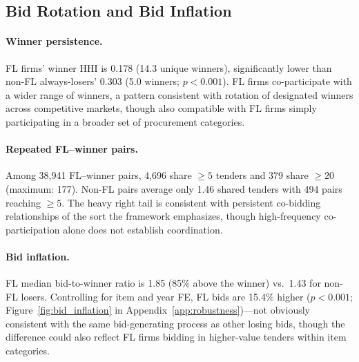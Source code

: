 
\subsection{Bid Rotation and Bid Inflation}
\label{sec:bid_rotation}

\paragraph{Winner persistence.}
FL firms' winner HHI is 0.178 (14.3 unique winners), significantly
lower than non-FL always-losers' 0.303 (5.0 winners; $p < 0.001$).
FL firms co-participate with a wider range of winners, a pattern
consistent with rotation of designated winners across competitive
markets, though also compatible with FL firms simply participating
in a broader set of procurement categories.

\paragraph{Repeated FL--winner pairs.}
Among 38,941 FL--winner pairs, 4,696 share $\geq 5$ tenders and
379 share $\geq 20$ (maximum: 177). Non-FL pairs average only
1.46 shared tenders with 494 pairs reaching $\geq 5$. The heavy
right tail is consistent with persistent co-bidding relationships
of the sort the framework emphasizes, though high-frequency
co-participation alone does not establish coordination.

\paragraph{Bid inflation.}
FL median bid-to-winner ratio is 1.85 (85\% above the winner) vs.\
1.43 for non-FL losers. Controlling for item and year FE, FL bids
are 15.4\% higher ($p < 0.001$;
Figure~\ref{fig:bid_inflation} in Appendix~\ref{app:robustness})---not
obviously consistent with the same bid-generating process as other
losing bids, though the difference could also reflect FL firms
bidding in higher-value tenders within item categories.
